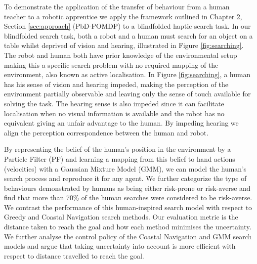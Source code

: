 To demonstrate the application of the transfer of behaviour from a human teacher to a robotic apprentice we apply the framework outlined in Chapter 2, 
Section \ref{sec:approach} (PbD-POMDP) to a blindfolded haptic search task. In our blindfolded search task, both a robot and a human 
must search for an object on a table whilst deprived of vision and hearing, illustrated in Figure \ref{fig:searching}. 
The robot and human both have prior knowledge of the environmental setup making this a specific search problem with no required mapping of the environment, also known as active localisation. 
In Figure \ref{fig:searching}, a human has his sense of vision and hearing impeded, making the perception of the environment partially observable and 
leaving only the sense of touch available for solving the task. The hearing sense is also impeded since it can 
facilitate localisation when no visual information is available and the robot has no equivalent giving an unfair 
advantage to the human. By impeding hearing we align the perception correspondence between the human and robot.

By representing the belief of the human's position in the environment by a Particle Filter (PF) and learning a mapping from this belief 
to hand actions (velocities) with a Gaussian Mixture Model (GMM), we can model the human's search process and reproduce it for any agent. 
We further categorize the type of behaviours demonstrated by humans as being either risk-prone or risk-averse and find that more than 70\% of 
the human searches were considered to be risk-averse. We contrast the performance of this human-inspired search model with respect to Greedy and Coastal Navigation search methods. 
Our evaluation metric is the distance taken to reach the goal and how each method minimises the uncertainty.
We further analyse the control policy of the Coastal Navigation and GMM search models and argue that taking  uncertainty
into account is more efficient with respect to distance travelled to reach the goal.

